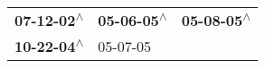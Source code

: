 \begin{supertabular}{lll}
 \textbf{07-12-02\textsuperscript{$\wedge$}} &  \textbf{05-06-05\textsuperscript{$\wedge$}} &  \textbf{05-08-05\textsuperscript{$\wedge$}} \\
 \textbf{10-22-04\textsuperscript{$\wedge$}} &                   05-07-05\textsuperscript{} &                                              \\
\end{supertabular}

